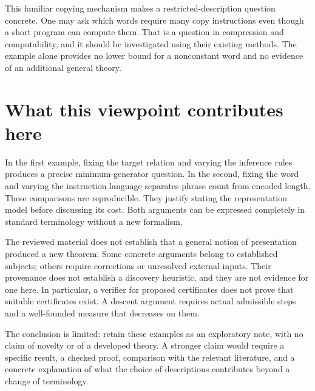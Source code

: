 \documentclass[11pt]{article}
\begin{document}
This familiar copying mechanism makes a restricted-description question
concrete. One may ask which words require many copy instructions even though a
short program can compute them. That is a question in compression and
computability, and it should be investigated using their existing methods. The
example alone provides no lower bound for a nonconstant word and no evidence of
an additional general theory.

\section{What this viewpoint contributes here}
In the first example, fixing the target relation and varying the inference rules
produces a precise minimum-generator question. In the second, fixing the word
and varying the instruction language separates phrase count from encoded length.
These comparisons are reproducible. They justify stating the representation
model before discussing its cost. Both arguments can be expressed completely in
standard terminology without a new formalism.

The reviewed material does not establish that a general notion of presentation
produced a new theorem. Some concrete arguments belong to established subjects;
others require corrections or unresolved external inputs. Their provenance does
not establish a discovery heuristic, and they are not evidence for one here.
In particular, a verifier for proposed certificates does not prove that suitable
certificates exist. A descent argument requires actual admissible steps and a
well-founded measure that decreases on them.

The conclusion is limited: retain these examples as an exploratory note, with
no claim of novelty or of a developed theory. A stronger claim would require a
specific result, a checked proof, comparison with the relevant literature, and a
concrete explanation of what the choice of descriptions contributes beyond a
change of terminology.
\end{document}
